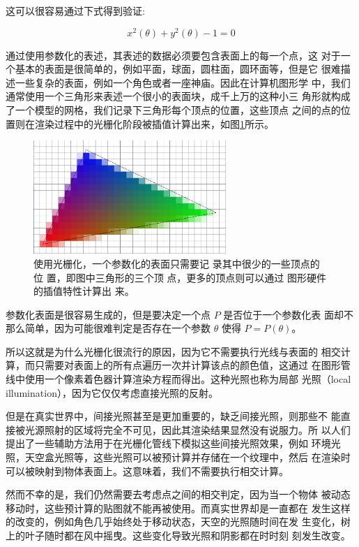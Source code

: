 \noindent 这可以很容易通过下式得到验证:

\begin{equation}
	x^{2}(\theta)+y^{2}(\theta)-1=0
\end{equation}

通过使用参数化的表述，其表述的数据必须要包含表面上的每一个点，这 对于一个基本的表面是很简单的，例如平面，球面，圆柱面，圆环面等，但是它 很难描述一些复杂的表面，例如一个角色或者一座神庙。因此在计算机图形学 中，我们通常使用一个三角形来表述一个很小的表面块，成千上万的这种小三 角形就构成了一个模型的网格，我们记录下三角形每个顶点的位置，这些顶点 之间的点的位置则在渲染过程中的光栅化阶段被插值计算出来，如图\ref{f:df-rasterization}所示。

\begin{figure}
	\sidecaption
	\includegraphics[width=0.65\textwidth]{figures/df/rasterization}
	\caption{使用光栅化，一个参数化的表面只需要记 录其中很少的一些顶点的位 置，即图中三角形的三个顶 点，更多的顶点则可以通过 图形硬件的插值特性计算出 来。}
	\label{f:df-rasterization}
\end{figure}

参数化表面是很容易生成的，但是要决定一个点 $P$ 是否位于一个参数化表 面却不那么简单，因为可能很难判定是否存在一个参数 $\theta$ 使得 $P = P (\theta)$。

所以这就是为什么光栅化很流行的原因，因为它不需要执行光线与表面的 相交计算，而只需要对表面上的所有点遍历一次并计算该点的颜色值，这通过 在图形管线中使用一个像素着色器计算渲染方程而得出。这种光照也称为局部 光照（local illumination），因为它仅仅考虑直接光照的反射。

但是在真实世界中，间接光照甚至是更加重要的，缺乏间接光照，则那些不 能直接被光源照射的区域将完全不可见，因此其渲染结果显然没有说服力。所 以人们提出了一些辅助方法用于在光栅化管线下模拟这些间接光照效果，例如 环境光照，天空盒光照等，这些光照可以被预计算并存储在一个纹理中，然后 在渲染时可以被映射到物体表面上。这意味着，我们不需要执行相交计算。

然而不幸的是，我们仍然需要去考虑点之间的相交判定，因为当一个物体 被动态移动时，这些预计算的贴图就不能再被使用。而真实世界却是一直都在 发生这样的改变的，例如角色几乎始终处于移动状态，天空的光照随时间在发 生变化，树上的叶子随时都在风中摇曳。这些变化导致光照和阴影都在时时刻 刻发生改变。


